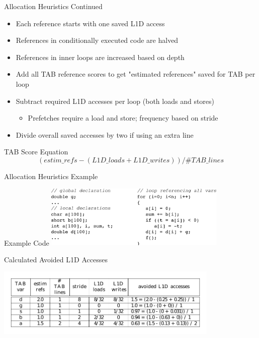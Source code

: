 \documentclass{beamer}
\begin{document}
\begin{frame}{Allocation Heuristics Continued}
   \begin{itemize}
      \item Each reference starts with one saved L1D access
      \item References in conditionally executed code are halved
      \item References in inner loops are increased based on depth
      \item Add all TAB reference scores to get "estimated references" 
         saved for TAB per loop
      \item Subtract required L1D accesses per loop (both loads and stores)
         \begin{itemize}
            \item Prefetches require a load and store; frequency based on stride
         \end{itemize}
      \item Divide overall saved accesses by two if using an extra line
   \end{itemize}
   \begin{block}{TAB Score Equation}
      \begin{equation}
         (estim\_refs - (L1D\_loads + L1D\_writes)) / \#TAB\_lines
      \end{equation}
   \end{block}
\end{frame}
\begin{frame}{Allocation Heuristics Example}
   \begin{block}{Example Code}
      \includegraphics[width=0.65\textwidth]{figures/estimationexample_horizontal.pdf}
   \end{block}
   \begin{block}{Calculated Avoided L1D Accesses}
      \begin{center}
      \includegraphics[width=0.80\textwidth]{figures/estimationtable.pdf}
      \end{center}
   \end{block}
\end{frame}
\end{document}

